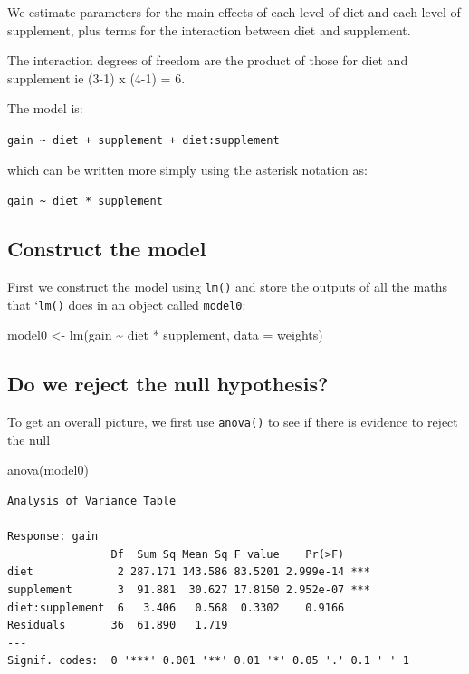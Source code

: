 \documentclass[
  letterpaper,
  DIV=11,
  numbers=noendperiod]{scrreprt}
\newenvironment{Shaded}{\begin{snugshade}}{\end{snugshade}}
\newcommand{\AttributeTok}[1]{\textcolor[rgb]{0.40,0.45,0.13}{#1}}
\newcommand{\FunctionTok}[1]{\textcolor[rgb]{0.28,0.35,0.67}{#1}}
\newcommand{\NormalTok}[1]{\textcolor[rgb]{0.00,0.23,0.31}{#1}}
\newcommand{\OtherTok}[1]{\textcolor[rgb]{0.00,0.23,0.31}{#1}}
\newcommand{\SpecialCharTok}[1]{\textcolor[rgb]{0.37,0.37,0.37}{#1}}
\begin{document}
We estimate parameters for the main effects of each level of diet and
each level of supplement, plus terms for the interaction between diet
and supplement.

The interaction degrees of freedom are the product of those for diet and
supplement ie (3-1) x (4-1) = 6.

The model is:

\texttt{gain\ \textasciitilde{}\ diet\ +\ supplement\ +\ diet:supplement}

which can be written more simply using the asterisk notation as:

\texttt{gain\ \textasciitilde{}\ diet\ *\ supplement}

\subsection{Construct the model}\label{construct-the-model}

First we construct the model using \texttt{lm()} and store the outputs
of all the maths that `\texttt{lm()} does in an object called
\texttt{model0}:

\begin{Shaded}
\begin{Highlighting}[]
\NormalTok{model0 }\OtherTok{\textless{}{-}} \FunctionTok{lm}\NormalTok{(gain }\SpecialCharTok{\textasciitilde{}}\NormalTok{ diet }\SpecialCharTok{*}\NormalTok{ supplement, }\AttributeTok{data =}\NormalTok{ weights)}
\end{Highlighting}
\end{Shaded}

\subsection{Do we reject the null
hypothesis?}\label{do-we-reject-the-null-hypothesis}

To get an overall picture, we first use \texttt{anova()} to see if there
is evidence to reject the null

\begin{Shaded}
\begin{Highlighting}[]
\FunctionTok{anova}\NormalTok{(model0)}
\end{Highlighting}
\end{Shaded}

\begin{verbatim}
Analysis of Variance Table

Response: gain
                Df  Sum Sq Mean Sq F value    Pr(>F)    
diet             2 287.171 143.586 83.5201 2.999e-14 ***
supplement       3  91.881  30.627 17.8150 2.952e-07 ***
diet:supplement  6   3.406   0.568  0.3302    0.9166    
Residuals       36  61.890   1.719                      
---
Signif. codes:  0 '***' 0.001 '**' 0.01 '*' 0.05 '.' 0.1 ' ' 1
\end{verbatim}
\end{document}
